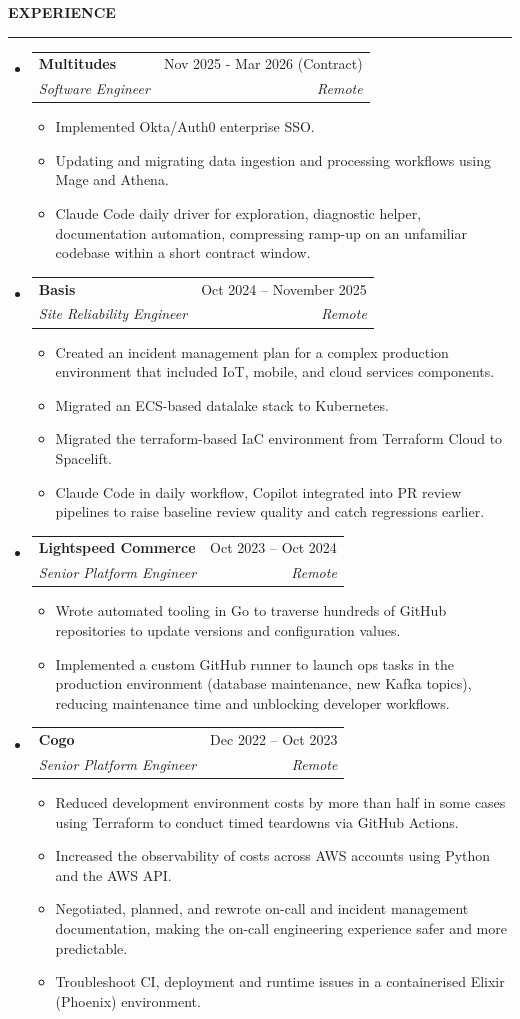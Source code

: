 \documentclass[12pt]{article}
\makeatletter
\def \entryspacing {0em}
\renewcommand{\section}[2]{\vspace{1.2ex}
  {\color{secondary}\normalsize#1\hspace{0.8em}\textbf{\MakeUppercase{#2}}}\par\vspace{-0.6ex}
  {\color{secondary}\rule{\textwidth}{0.4pt}}\vspace{-0.8ex}
}
\newcommand{\resumeEntryStart}{\begin{itemize}[leftmargin=2.5mm]}
\newcommand{\resumeEntryEnd}{\end{itemize}\vspace{\entryspacing}}
\newcommand{\resumeItemListStart}{\begin{itemize}[leftmargin=4.5mm]}
\newcommand{\resumeItemListEnd}{\end{itemize}}
\newcommand{\resumeItem}[1]{
  \item\small{
    {#1 \vspace{-0.9ex}}
  }
}
\newcommand{\resumeEntryTSDL}[4]{
  \vspace{-0.5ex}\item[]
    \begin{tabularx}{0.97\textwidth}{X@{\hspace{5em}}r}
      \textbf{\color{primary}#1} & {\firabook\color{muted}\small#2} \\
      \textit{\color{accent}\small#3} & \textit{\color{muted}\small#4} \\
    \end{tabularx}\vspace{-0.9ex}
}
\makeatother
\begin{document}
\section{\faPieChart}{Experience}

  \resumeEntryStart
    \resumeEntryTSDL
      {Multitudes}{Nov 2025 - Mar 2026 (Contract)}
      {Software Engineer}{Remote}
    \resumeItemListStart
      \resumeItem {Implemented Okta/Auth0 enterprise SSO.}
      \resumeItem {Updating and migrating data ingestion and processing workflows using Mage and Athena.}
      \resumeItem {Claude Code daily driver for exploration, diagnostic helper, documentation automation, compressing ramp-up on an unfamiliar codebase within a short contract window.}
    \resumeItemListEnd
  \resumeEntryEnd
  
  \resumeEntryStart
    \resumeEntryTSDL
      {Basis}{Oct 2024 -- November 2025}
      {Site Reliability Engineer}{Remote}
    \resumeItemListStart
      \resumeItem {Created an incident management plan for a complex production environment that included IoT, mobile, and cloud services components.}
      \resumeItem {Migrated an ECS-based datalake stack to Kubernetes.}
      \resumeItem {Migrated the terraform-based IaC environment from Terraform Cloud to Spacelift.}
      \resumeItem {Claude Code in daily workflow, Copilot integrated into PR review pipelines to raise baseline review quality and catch regressions earlier.}
    \resumeItemListEnd
  \resumeEntryEnd
  
  \resumeEntryStart
    \resumeEntryTSDL
      {Lightspeed Commerce}{Oct 2023 -- Oct 2024}
      {Senior Platform Engineer}{Remote}
    \resumeItemListStart
      \resumeItem {Wrote automated tooling in Go to traverse hundreds of GitHub repositories to update versions and configuration values.}
      \resumeItem {Implemented a custom GitHub runner to launch ops tasks in the production environment (database maintenance, new Kafka topics), reducing maintenance time and unblocking developer workflows.}
    \resumeItemListEnd
  \resumeEntryEnd
  
  \resumeEntryStart
    \resumeEntryTSDL
      {Cogo}{Dec 2022 -- Oct 2023}
      {Senior Platform Engineer}{Remote}
    \resumeItemListStart
      \resumeItem {Reduced development environment costs by more than half in some cases using Terraform to conduct timed teardowns via GitHub Actions.}
      \resumeItem {Increased the observability of costs across AWS accounts using Python and the AWS API.}
      \resumeItem {Negotiated, planned, and rewrote on-call and incident management documentation, making the on-call engineering experience safer and more predictable.}
      \resumeItem {Troubleshoot CI, deployment and runtime issues in a containerised Elixir (Phoenix) environment.}
    \resumeItemListEnd
  \resumeEntryEnd
\end{document}
